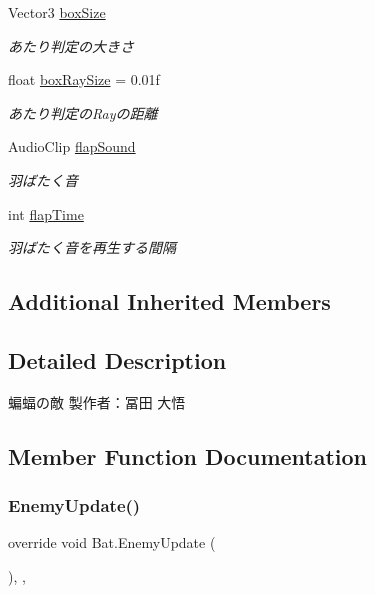 \begin{DoxyCompactItemize}
Vector3 \hyperlink{class_bat_a3a09b412fabb3b34687291dcd6af9ae1}{box\+Size}
\begin{DoxyCompactList}\small\item\em あたり判定の大きさ \end{DoxyCompactList}\item 
float \hyperlink{class_bat_aaa5dc118011ac51afc65feee9f75b7e5}{box\+Ray\+Size} = 0.\+01f
\begin{DoxyCompactList}\small\item\em あたり判定の\+Rayの距離 \end{DoxyCompactList}\item 
Audio\+Clip \hyperlink{class_bat_a41382898d4635428ab66dcf4d5695281}{flap\+Sound}
\begin{DoxyCompactList}\small\item\em 羽ばたく音 \end{DoxyCompactList}\item 
int \hyperlink{class_bat_aab314f8d3d3ea9c051fdc6d812f56e8b}{flap\+Time}
\begin{DoxyCompactList}\small\item\em 羽ばたく音を再生する間隔 \end{DoxyCompactList}\end{DoxyCompactItemize}
\subsection*{Additional Inherited Members}


\subsection{Detailed Description}
蝙蝠の敵 製作者：冨田 大悟 



\subsection{Member Function Documentation}
\mbox{\label{class_bat_af1e6e4432c5f803973be596a31cbb650}} 
\subsubsection{\texorpdfstring{Enemy\+Update()}{EnemyUpdate()}}
{\footnotesize\ttfamily override void Bat.\+Enemy\+Update (\begin{DoxyParamCaption}{ }\end{DoxyParamCaption})\hspace{0.3cm}{\ttfamily [inline]}, {\ttfamily [protected]}, {\ttfamily [virtual]}}



